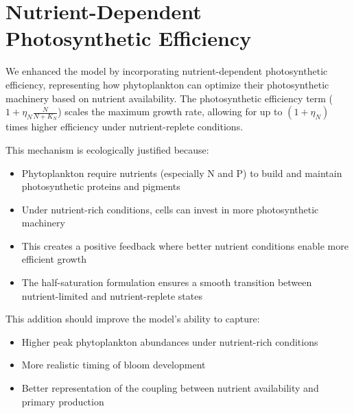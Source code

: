\section{Nutrient-Dependent Photosynthetic Efficiency}

We enhanced the model by incorporating nutrient-dependent photosynthetic efficiency, representing how phytoplankton can optimize their photosynthetic machinery based on nutrient availability. The photosynthetic efficiency term ($1 + \eta_N \frac{N}{N + K_N}$) scales the maximum growth rate, allowing for up to $(1 + \eta_N)$ times higher efficiency under nutrient-replete conditions.

This mechanism is ecologically justified because:
\begin{itemize}
\item Phytoplankton require nutrients (especially N and P) to build and maintain photosynthetic proteins and pigments
\item Under nutrient-rich conditions, cells can invest in more photosynthetic machinery
\item This creates a positive feedback where better nutrient conditions enable more efficient growth
\item The half-saturation formulation ensures a smooth transition between nutrient-limited and nutrient-replete states
\end{itemize}

This addition should improve the model's ability to capture:
\begin{itemize}
\item Higher peak phytoplankton abundances under nutrient-rich conditions
\item More realistic timing of bloom development
\item Better representation of the coupling between nutrient availability and primary production
\end{itemize}
